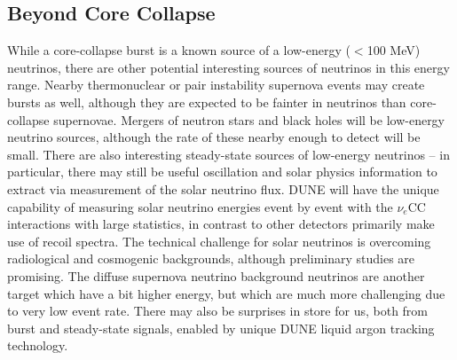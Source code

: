 \subsection{Beyond Core Collapse}
While a core-collapse burst is a known source of a
low-energy ($<$100 MeV) neutrinos, there are other potential
interesting sources of neutrinos in this energy range.  Nearby
thermonuclear or pair instability supernova events may create bursts
as well, although they are expected to be fainter in neutrinos than
core-collapse supernovae.  Mergers of neutron stars and black holes
will be low-energy neutrino sources, although the rate of these nearby
enough to detect will be small.  There are also interesting
steady-state sources of low-energy neutrinos -- in particular, there
may still be useful oscillation and solar physics information to
extract via measurement of the solar neutrino flux. DUNE will have the
unique capability of measuring solar neutrino energies event by event
with the $\nu_e$CC interactions with large statistics, in contrast to
other detectors primarily make use of recoil spectra.  The technical
challenge for solar neutrinos is overcoming radiological and
cosmogenic backgrounds, although preliminary studies are promising.
The diffuse supernova neutrino background neutrinos are another target
which have a bit higher energy, but which are much more challenging due to very low
event rate.  There may also be surprises in store for us, both from burst
and steady-state signals, enabled by unique DUNE liquid argon tracking
technology.

